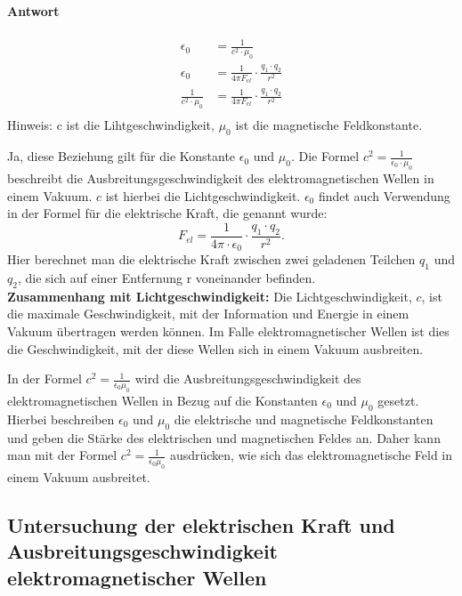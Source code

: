 \documentclass[a4paper]{report}
\begin{document}
\paragraph{Antwort}
\begin{align}
  \epsilon_0&=\frac{1}{c^2\cdot \mu_0}\\
  \epsilon_0&=\frac{1}{4\pi F_{el}}\cdot \frac{q_1\cdot q_2}{r^2}\\
  \frac{1}{c^2\cdot \mu_0}&=\frac{1}{4\pi F_{el}}\cdot \frac{q_1\cdot q_2}{r^2}\\
\end{align}
Hinweis: c ist die Lihtgeschwindigkeit, $\mu_0$ ist die magnetische Feldkonstante.

\noindent Ja, diese Beziehung gilt für die Konstante $\epsilon_0$  und $\mu_0$. 
Die Formel $c^2 = \frac{1}{\epsilon_0\cdot \mu_0}$ beschreibt die
Ausbreitungsgeschwindigkeit des elektromagnetischen Wellen in einem Vakuum. $c$
ist hierbei die Lichtgeschwindigkeit.
$\epsilon_0$ findet auch Verwendung in der Formel für die elektrische Kraft, die
genannt wurde: \[F_{el} = \frac{1}{4\pi \cdot \epsilon_0}\cdot \frac{q_1 \cdot  q_2}{r^2}.\] Hier berechnet
man die elektrische Kraft zwischen zwei geladenen Teilchen $q_1$ und $q_2$, die
sich auf einer Entfernung r voneinander befinden.\\

\noindent\textbf{Zusammenhang mit Lichtgeschwindigkeit:}
Die Lichtgeschwindigkeit, $c$, ist die maximale Geschwindigkeit, mit der
Information und Energie in einem Vakuum übertragen werden können. Im Falle
elektromagnetischer Wellen ist dies die Geschwindigkeit, mit der diese Wellen
sich in einem Vakuum ausbreiten.

\noindent In der Formel $c^2 = \frac{1}{\epsilon_0 \mu_0}$ wird die
Ausbreitungsgeschwindigkeit des elektromagnetischen Wellen in Bezug auf die
Konstanten $\epsilon_0$ und $\mu_0$ gesetzt. Hierbei beschreiben $\epsilon_0$
und $\mu_0$ die elektrische und magnetische Feldkonstanten und geben die Stärke
des elektrischen und magnetischen Feldes an. Daher kann man mit der Formel $c^2
= \frac{1}{\epsilon_0 \mu_0}$ ausdrücken, wie sich das elektromagnetische Feld
in einem Vakuum ausbreitet.
\clearpage
\subsection{Untersuchung der elektrischen Kraft und Ausbreitungsgeschwindigkeit elektromagnetischer Wellen}
\end{document}
